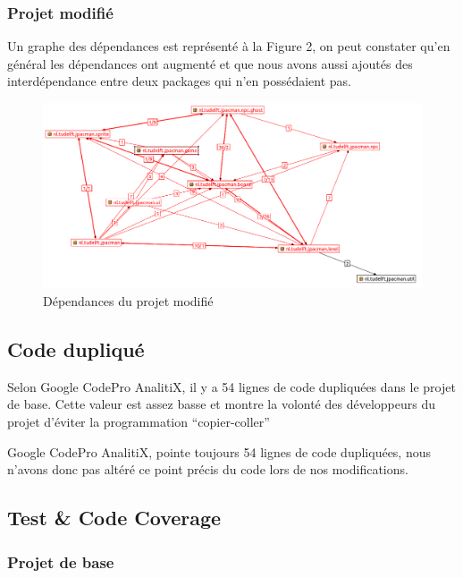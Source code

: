\documentclass[a4paper,12pt]{report} %
\begin{document}
\subsubsection{Projet modifié}

Un graphe des dépendances est représenté à la Figure 2, on peut constater
qu'en général les dépendances ont augmenté et que nous avons aussi
ajoutés des interdépendance entre deux packages qui n'en possédaient
pas.

\begin{figure}[!h]
\begin{center}\includegraphics[scale=0.5]{ressources/final_new_dependencies}\end{center}\caption{Dépendances du projet modifié}


\end{figure}



\subsection{Code dupliqué}

Selon Google CodePro AnalitiX, il y a 54 lignes de code dupliquées
dans le projet de base. Cette valeur est assez basse et montre la
volonté des développeurs du projet d'éviter la programmation ``copier-coller''

Google CodePro AnalitiX, pointe toujours 54 lignes de code dupliquées,
nous n'avons donc pas altéré ce point précis du code lors de nos modifications.


\subsection{Test \& Code Coverage}


\subsubsection{Projet de base}
\end{document}
